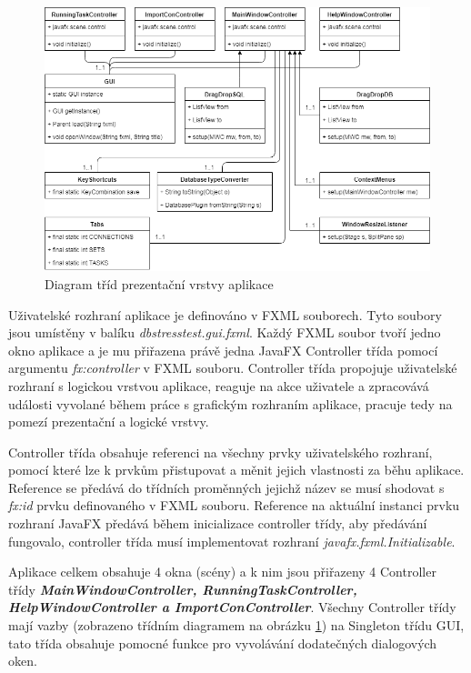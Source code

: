 \documentclass[czech,bachelor,public,dept460,male,cpdeclaration,twoside]{diploma}
\begin{document}
\begin{figure}[!htbp]\centering\includegraphics[width=1.0\textwidth]{Figures/presentlayer.png}\caption{Diagram tříd prezentační vrstvy aplikace}\label{presentdiagram}
\end{figure}

Uživatelské rozhraní aplikace je definováno v FXML souborech. Tyto soubory jsou umístěny v balíku \textit{dbstresstest.gui.fxml}. Každý FXML soubor tvoří jedno okno aplikace a je mu přiřazena právě jedna JavaFX Controller třída pomocí argumentu \textit{fx:controller} v FXML souboru. Controller třída propojuje uživatelské rozhraní s logickou vrstvou aplikace, reaguje na akce uživatele a zpracovává události vyvolané během práce s grafickým rozhraním aplikace, pracuje tedy na pomezí prezentační a logické vrstvy.

Controller třída obsahuje referenci na všechny prvky uživatelského rozhraní, pomocí které lze k prvkům přistupovat a měnit jejich vlastnosti za běhu aplikace. Reference se předává do třídních proměnných jejichž název se musí shodovat s \textit{fx:id} prvku definovaného v FXML souboru. Reference na aktuální instanci prvku rozhraní JavaFX předává během inicializace controller třídy, aby předávání fungovalo, controller třída musí implementovat rozhraní \textit{javafx.fxml.Initializable}.

Aplikace celkem obsahuje 4 okna (scény) a k nim jsou přiřazeny 4 Controller třídy \newline \textbf{\emph{MainWindowController, RunningTaskController, HelpWindowController a ImportConController}}. Všechny Controller třídy mají vazby (zobrazeno třídním diagramem na obrázku \ref{presentdiagram}) na Singleton třídu GUI, tato třída obsahuje pomocné funkce pro vyvolávání dodatečných dialogových oken. 
\end{document}
